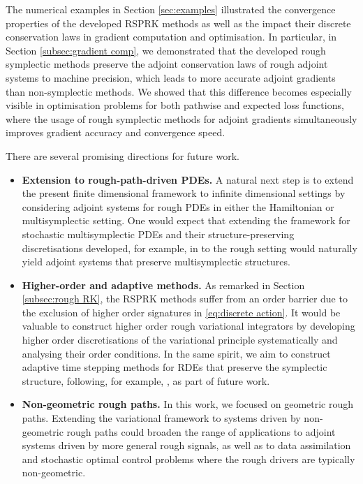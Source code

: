 \documentclass[11pt, oneside]{article}
\numberwithin{equation}{section}
\theoremstyle{definition}
\begin{document}
The numerical examples in Section \ref{sec:examples} illustrated the convergence properties of the developed RSPRK methods as well as the impact their discrete conservation laws in gradient computation and optimisation. In particular, in Section \ref{subsec:gradient comp}, we demonstrated that the developed rough symplectic methods preserve the adjoint conservation laws of rough adjoint systems to machine precision, which leads to more accurate adjoint gradients than non-symplectic methods. We showed that this difference becomes especially visible in optimisation problems for both pathwise and expected loss functions, where the usage of rough symplectic methods for adjoint gradients simultaneously improves gradient accuracy and convergence speed.

There are several promising directions for future work.
\begin{itemize}
    \item \textbf{Extension to rough-path-driven PDEs.} A natural next step is to extend the present finite dimensional framework to infinite dimensional settings by considering adjoint systems for rough PDEs in either the Hamiltonian or multisymplectic setting. One would expect that extending the framework for stochastic multisymplectic PDEs and their structure-preserving discretisations developed, for example, in \cite{HP2025} to the rough setting would naturally yield adjoint systems that preserve multisymplectic structures.
    \item \textbf{Higher-order and adaptive methods.} As remarked in Section \ref{subsec:rough RK}, the RSPRK methods suffer from an order barrier due to the exclusion of higher order signatures in \eqref{eq:discrete action}. It would be valuable to construct higher order rough variational integrators by developing higher order discretisations of the variational principle systematically and analysing their order conditions. In the same spirit, we aim to construct adaptive time stepping methods for RDEs that preserve the symplectic structure, following, for example, \cite{Duruisseaux2021}, as part of future work.
    \item \textbf{Non-geometric rough paths.} In this work, we focused on geometric rough paths. Extending the variational framework to systems driven by non-geometric rough paths could broaden the range of applications to adjoint systems driven by more general rough signals, as well as to data assimilation and stochastic optimal control problems where the rough drivers are typically non-geometric.
\end{itemize}
\end{document}
